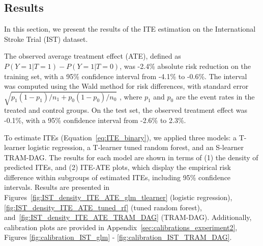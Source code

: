 



\subsection{Results} \label{sec:results_experiment2}


In this section, we present the results of the ITE estimation on the International Stroke Trial (IST) dataset. 

The observed average treatment effect (ATE), defined as $P(Y=1|T=1) - P(Y=1|T=0)$, was -2.4\% absolute risk reduction on the training set, with a 95\% confidence interval from -4.1\% to -0.6\%. The interval was computed using the Wald method for risk differences, with standard error $\sqrt{p_1 (1 - p_1)/n_1 + p_0 (1 - p_0)/n_0}$
, where $p_1$ and $p_0$ are the event rates in the treated and control groups. On the test set, the observed treatment effect was -0.1\%, with a 95\% confidence interval from -2.6\% to 2.3\%. 

To estimate ITEs (Equation~\ref{eq:ITE_binary}), we applied three models: a T-learner logistic regression, a T-learner tuned random forest, and an S-learner TRAM-DAG. The results for each model are shown in terms of (1) the density of predicted ITEs, and (2) ITE-ATE plots, which display the empirical risk difference within subgroups of estimated ITEs, including 95\% confidence intervals. Results are presented in Figures~\ref{fig:IST_density_ITE_ATE_glm_tlearner} (logistic regression), \ref{fig:IST_density_ITE_ATE_tuned_rf} (tuned random forest), and~\ref{fig:IST_density_ITE_ATE_TRAM_DAG} (TRAM-DAG). Additionally, calibration plots are provided in Appendix~\ref{sec:calibrations_experiment2}, Figures \ref{fig:calibration_IST_glm} - \ref{fig:calibration_IST_TRAM_DAG}. 


